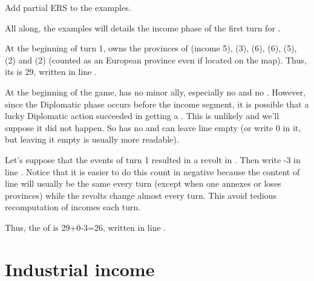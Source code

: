 \begin{todo}
  Add partial ERS to the examples.
\end{todo}

\begin{exemple}
  All along, the examples will details the income phase of the first
  turn for \POR.

  At the beginning of turn 1, \POR owns the provinces of
   (income 5), \provinceBeira (3),
  \provinceTejo (6), \provinceAlentejo (6), \provinceAlgarve (5),
  \provinceTanger (2) and \provinceAcores (2) (counted as an European
  province even if located on the \ROTW map). Thus, its  is 29\ducats, written in line .

  At the beginning of the game, \POR has no minor ally, especially no
  \VASSAL and no . However, since the
  Diplomatic phase occurs before the income segment, it is possible that
  a lucky Diplomatic action succeeded in getting \POR a \VASSAL. This is
  unlikely and we'll suppose it did not happen. So \POR has no
   and can leave line  empty (or write 0 in it, but leaving it empty is
  usually more readable).

  Let's suppose that the events of turn 1 resulted in a revolt in
  \provinceBeira. Then \POR write -3 in line . Notice that it is easier to do this count in
  negative because the content of line 
  will usually be the same every turn (except when one annexes or loses
  provinces) while the revolts change almost every turn. This avoid
  tedious recomputation of incomes each turn.

  Thus, the  of \POR is 29+0-3=26\ducats, written in
  line .
\end{exemple}


\section{Industrial income}\label{chIncomes:IndustrialIncome}
